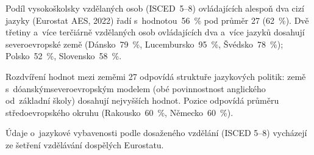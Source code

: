 Podíl vysokoškolsky vzdělaných osob (\acs{ISCED}~5--8) ovládajících alespoň dva cizí jazyky (Eurostat \acs{AES}, 2022) řadí  s~hodnotou~\SI{56}{\percent} pod průměr 27 (\SI{62}{\percent}). Dvě třetiny a~více terčiárně vzdělaných osob ovládajících dva a~více jazyků dosahují severoevropské země (Dánsko~\SI{79}{\percent}, Lucembursko~\SI{95}{\percent}, Švédsko~\SI{78}{\percent}); Polsko~\SI{52}{\percent}, Slovensko~\SI{58}{\percent}.

Rozdvíření hodnot mezi zeměmi 27 odpovídá struktuře jazykových politik: země s~dóanským\/severoevropským modelem (obé povinnostnost anglického od~základní školy) dosahují nejvyšších hodnot. Pozice  odpovídá průměru středoevropského okruhu (Rakousko~\SI{60}{\percent}, Německo~\SI{60}{\percent}).

Údaje o~jazykové vybavenosti podle dosaženého vzdělání (\acs{ISCED} 5--8) vycházejí ze šetření vzdělávání dospělých Eurostatu.\par


